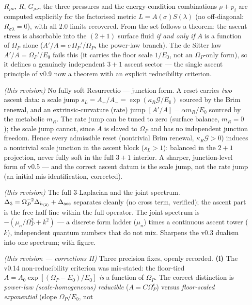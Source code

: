 \documentclass[11pt,a4paper]{article}
\theoremstyle{plain}
\theoremstyle{definition}
\theoremstyle{remark}
\begin{document}
\begin{description}[leftmargin=4.2em,style=nextline,itemsep=2pt]
$R_{\mu\nu}$, $R$, $G_{\mu\nu}$, the three pressures and the energy-condition combinations $\rho+p_i$
are computed explicitly for the factorised metric $L=A(\sigma)S(\lambda)$ (no off-diagonal:
$R_{\sigma\lambda}=0$), with all 2.0 limits recovered. From the set follows a theorem: the ascent
stress is absorbable into the $(2{+}1)$ surface fluid \emph{if and only if} $A$ is a function of
$\Omega_P$ alone ($A'/A=c\,\Omega_P'/\Omega_P$, the power-law branch). The de Sitter law
$A'/A=\Omega_P'/E_0$ fails this (it carries the floor scale $1/E_0$, not an $\Omega_P$-only form), so it
defines a genuinely independent $3{+}1$ ascent sector --- the single ascent principle of v0.9 now a
theorem with an explicit reducibility criterion.
\item[\textbf{v0.15}] \emph{(this revision)} No fully soft Resurrectio --- junction form. A reset
carries \emph{two} ascent data: a scale jump $s_L=A_+/A_-=\exp(\kappa_R\mathcal G/E_0)$ sourced by the
Brim renewal, and an extrinsic-curvature (rate) jump $[A'/A]=\alpha m_R/E_0$ sourced by the metabolic
$m_R$. The rate jump can be tuned to zero (surface balance, $m_R=0$); the scale jump cannot, since $A$
is slaved to $\Omega_P$ and has no independent junction freedom. Hence every admissible reset
(nontrivial Brim renewal, $\kappa_R\mathcal G>0$) induces a nontrivial scale junction in the ascent
block ($s_L>1$): balanced in the $2{+}1$ projection, never fully soft in the full $3{+}1$ interior. A
sharper, junction-level form of v0.5 --- and the correct ascent datum is the scale jump, not the rate
jump (an initial mis-identification, corrected).
\item[\textbf{v0.16}] \emph{(this revision)} The full $3$-Laplacian and the joint spectrum.
$\Delta_3=\Omega_P^{-2}\Delta_{h_{(2)}}+\Delta_{\rm asc}$ separates cleanly (no cross term, verified);
the ascent part is the free half-line within the full operator. The joint spectrum is
$-(\mu_n/\Omega_P^2+k^2)$ --- a discrete form ladder ($\mu_n$) times a continuous ascent tower ($k$),
independent quantum numbers that do not mix. Sharpens the v0.3 dualism into one spectrum; with figure.
\item[\textbf{v0.17}] \emph{(this revision --- corrections II)} Three precision fixes, openly recorded.
\textbf{(i)} The v0.14 non-reducibility criterion was mis-stated: the floor-tied $A=A_0\exp[(\Omega_P-E_0)/E_0]$
\emph{is} a function of $\Omega_P$. The correct distinction is \emph{power-law (scale-homogeneous)
reducible} ($A=C\Omega_P^c$) versus \emph{floor-scaled exponential} (slope $\Omega_P/E_0$, not

\end{description}
\end{document}
